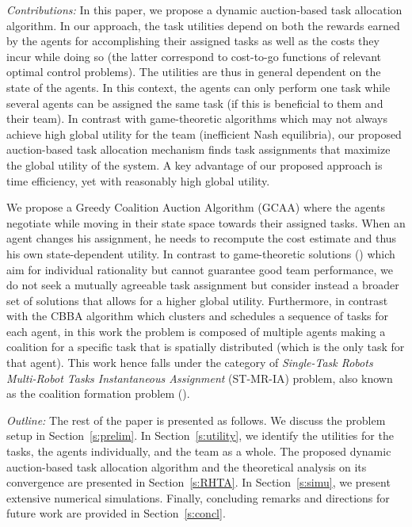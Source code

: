 \documentclass{ifacconf}
\begin{document}
\textit{Contributions:} In this paper, we propose a dynamic auction-based task allocation algorithm. In our approach, the task utilities depend on both the rewards earned by the agents for accomplishing their assigned tasks as well as the costs they incur while doing so (the latter correspond to cost-to-go functions of relevant optimal control problems). The utilities are thus in general dependent on the state of the agents. In this context, the agents can only perform one task while several agents can be assigned the same task (if this is beneficial to them and their team). In contrast with game-theoretic algorithms which may not always achieve high global utility for the team (inefficient Nash equilibria), our proposed auction-based task allocation mechanism finds task assignments that maximize the global utility of the system. A key advantage of our proposed approach is time efficiency, yet with reasonably high global utility.

We propose a Greedy Coalition Auction Algorithm (GCAA) where the agents negotiate while moving in their state space towards their assigned tasks. When an agent changes his assignment, he needs to recompute the cost estimate and thus his own state-dependent utility. In contrast to game-theoretic solutions (\cite{p:bakolas2020}) which aim for individual rationality but cannot guarantee good team performance, we do not seek a mutually agreeable task assignment but consider instead a broader set of solutions that allows for a higher global utility. Furthermore, in contrast with the CBBA algorithm which clusters and schedules a sequence of tasks for each agent, in this work the problem is composed of multiple agents making a coalition for a specific task that is spatially distributed (which is the only task for that agent). This work hence falls under the category of \textit{Single-Task Robots Multi-Robot Tasks Instantaneous Assignment} (ST-MR-IA) problem, also known as the coalition
formation problem (\cite{p:gerkey2004}).

\textit{Outline:} The rest of the paper is presented as follows. We discuss the problem setup in Section~\ref{s:prelim}. In Section~\ref{s:utility}, we identify the utilities for the tasks, the agents individually, and the team as a whole.
The proposed dynamic auction-based task allocation algorithm and the theoretical analysis on its convergence are presented in Section~\ref{s:RHTA}. In Section~\ref{s:simu}, we present extensive numerical simulations. Finally, concluding remarks and directions for future work are provided in Section~\ref{s:concl}.
\end{document}
